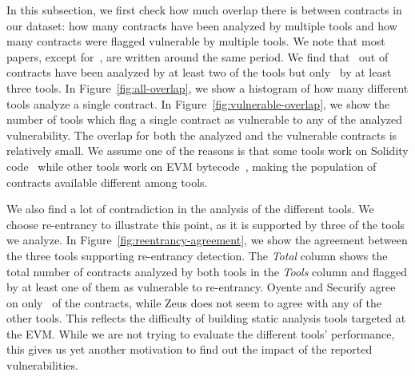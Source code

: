 
In this subsection, we first check how much overlap there is between contracts in our dataset: how many contracts have been analyzed by multiple tools and how many contracts were flagged vulnerable by multiple tools.
We note that most papers, except for~\cite{Luu2016a}, are written around the same period. We find that~ out of~ contracts have been analyzed by at least two of the tools but only~ by at least three tools.
In Figure~\ref{fig:all-overlap}, we show a histogram of how many different tools analyze a single contract. In Figure~\ref{fig:vulnerable-overlap}, we show the number of tools which flag a single contract as vulnerable to any of the analyzed vulnerability. The overlap for both the analyzed and the vulnerable contracts is relatively small. We assume one of the reasons is that some tools work on Solidity code~\cite{DBLP:conf/ndss/KalraGDS18} while other tools work on EVM bytecode~\cite{Tsankov2018,Luu2016a}, making the population of contracts available different among tools.

We also find a lot of contradiction in the analysis of the different tools.
We choose re-entrancy to illustrate this point, as it is supported by three of the tools we analyze. In Figure~\ref{fig:reentrancy-agreement}, we show the agreement between the three tools supporting re-entrancy detection. The \emph{Total} column shows the total number of contracts analyzed by both tools in the \emph{Tools} column and flagged by at least one of them as vulnerable to re-entrancy. Oyente and Securify agree on only~ of the contracts, while Zeus does not seem to agree with any of the other tools.
This reflects the difficulty of building static analysis tools targeted at the EVM. While we are not trying to evaluate the different tools' performance, this gives us yet another motivation to find out the impact of the reported vulnerabilities.
